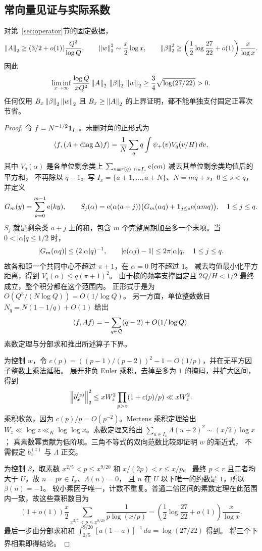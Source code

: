 \subsection{常向量见证与实际系数}
\begin{theorem}[系数无关范数方法的障碍]\label{thm:normbarrier}
对第~\ref{sec:operator}节的固定数据，
\[
\left\|A\right\|_2\ge(3/2+o(1))\frac{Q^2}{\log Q},\qquad
\left\|w\right\|_2^2\sim\frac x2\log x,\qquad
\left\|\beta\right\|_2^2\ge\left(\frac12\log\frac{27}{22}+o(1)\right)\frac x{\log x}.
\]
因此
\[
\liminf_{x\to\infty}\frac{\log Q}{xQ^2}
 \left\|A\right\|_2\,\left\|\beta\right\|_2\,\left\|w\right\|_2
\ge\frac34\sqrt{\log(27/22)}>0.
\]
任何仅用 $B_x\left\|\beta\right\|_2\left\|w\right\|_2$ 且 $B_x\ge\left\|A\right\|_2$ 的上界证明，都不能单独支付固定正幂次节省。
\end{theorem}
\begin{proof}
令 $f=N^{-1/2}\mathbf 1_{I_x}$。未删对角的正形式为
\[
\langle f,(A+\operatorname{diag}\Delta)f\rangle
=\frac1N\sum_q q\int\psi_+(v)V_q(v/H)\,dv ,
\]
其中 $V_q(\alpha)$ 是各单位剩余类上
$\sum_{n\equiv r(q),\,n\in I_x}\mathrm e(\alpha n)$ 减去其单位剩余类均值后的平方和，
不再除以 $q-1$。写 $I_x=\{a+1,\ldots,a+N\}$、$N=mq+s$，$0\le s<q$，并定义
\[
G_m(y)=\sum_{k=0}^{m-1}\mathrm e(ky),\qquad
S_j(\alpha)=\mathrm e(\alpha(a+j))
\bigl(G_m(\alpha q)+\mathbf 1_{j\le s}\mathrm e(\alpha mq)\bigr),\quad 1\le j\le q.
\]
$S_j$ 就是剩余类 $a+j$ 上的和，包含 $m$ 个完整周期加至多一个末项。当
$0<|\alpha|q\le1/2$ 时，
\[
|G_m(\alpha q)|\le(2|\alpha|q)^{-1},\qquad
|\mathrm e(\alpha j)-1|\le2\pi|\alpha|q,\quad 1\le j\le q.
\]
故各和距一个共同中心不超过 $\pi+1$，在 $\alpha=0$ 时不超过 $1$。
减去均值最小化平方距离，得到 $V_q(\alpha)\le q(\pi+1)^2$。
由于核的频率支撑固定且 $2Q/H<1/2$ 最终成立，整个积分都在这个范围内。
正形式于是为 $O(Q^3/(N\log Q))=O(1/\log Q)$。
另一方面，单位整数数目 $N_q=N(1-1/q)+O(1)$ 给出
\[
\langle f,Af\rangle=-\sum_{q\in\mathcal Q}(q-2)+O(1/\log Q).
\]
素数定理与分部求和推出所述算子下界。

为控制 $w$，令
$c(p)=((p-1)/(p-2))^2-1=O(1/p)$，并在无平方因子整数上乘法延拓。
展开非负 Euler 乘积，去掉至多为 $1$ 的掩码，并扩大区间，得到
\[
\left\|b_x^{(z)}\right\|_2^2
\le xW_z^2\prod_{p>z}(1+c(p)/p)\ll xW_z^2.
\]
乘积收敛，因为 $c(p)/p=O(p^{-2})$。Mertens 乘积定理给出
$W_z\ll\log z\ll_K\log\log x$。素数定理又给出
$\sum_{u\in I_x}\Lambda(u+2)^2\sim(x/2)\log x$；
真素数幂贡献为低阶项。三角不等式的双向范数比较即证明 $w$ 的渐近式，
不需假定 $b_x^{(z)}$ 与 $\Lambda$ 正交。

为控制 $\beta$，取素数
$x^{2/5}<p\le x^{9/20}$ 和 $x/(2p)<r\le x/p$。
最终 $p<r$ 且二者均大于 $U$，故 $n=pr\in I_x$、$\Lambda(n)=0$，
且 $n$ 在 $U$ 以下唯一的约数是 $1$，所以 $\beta(n)=-1$。
较小素因子唯一，计数不重复。普通二倍区间的素数定理在此范围内一致，故这些乘积数目为
\[
(1+o(1))\frac x2\sum_{x^{2/5}<p\le x^{9/20}}\frac1{p\log(x/p)}
=\left(\frac12\log\frac{27}{22}+o(1)\right)\frac x{\log x}.
\]
最后一步由分部求和和
$\int_{2/5}^{9/20}[a(1-a)]^{-1}\,da=\log(27/22)$ 得到。
将三个下界相乘即得结论。
\end{proof}

